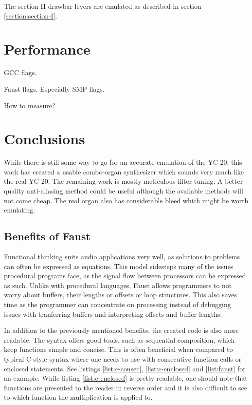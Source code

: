 \documentclass[11pt,a4paper]{article}
\begin{document}
The section II drawbar levers are emulated as described in section \ref{section:section-I}.

\section{Performance}

GCC flags.

Faust flags. Especially SMP flags.

How to measure?

\section{Conclusions}

While there is still some way to go for an accurate emulation of the YC-20, this work has created a usable combo-organ synthesizer which sounds very much like the real YC-20.  The remaining work is mostly meticulous filter tuning. A better quality anti-aliasing method could be useful although the available methods will not come cheap. The real organ also has considerable bleed which might be worth emulating.

\subsection{Benefits of Faust}

Functional thinking suits audio applications very well, as solutions to problems can often be expressed as equations. This model sidesteps many of the issues procedural programs face, as the signal flow between processors can be expressed as such. Unlike with procedural languages, Faust allows programmers to not worry about buffers, their lengths or offsets or loop structures. This also saves time as the programmer can concentrate on processing instead of debugging issues with tranferring buffers and interpreting offsets and buffer lengths.

In addition to the previously mentioned benefits, the created code is also more readable. The syntax offers good tools, such as sequential composition, which keep functions simple and concise. This is often beneficial when compared to typical C-style syntax where one needs to use with consecutive function calls or enclosed statements. See listings \ref{list:c-consec}, \ref{list:c-enclosed} and \ref{list:faust} for an example. While listing \ref{list:c-enclosed} is pretty readable, one should note that functions are presented to the reader in reverse order and it is also difficult to see to which function the multiplication is applied to.
\end{document}
